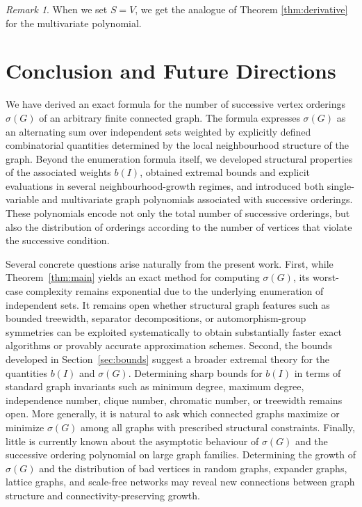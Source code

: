 \documentclass[11pt,a4paper]{article}
\numberwithin{equation}{section}
\theoremstyle{plain}
\theoremstyle{definition}
\theoremstyle{remark}
\newtheorem{remark}[theorem]{Remark}
\begin{document}
\begin{remark}
    When we set $S = V$, we get the analogue of Theorem \ref{thm:derivative} for the multivariate polynomial. 
\end{remark}

\section{Conclusion and Future Directions}
\label{sec:conclusion}

We have derived an exact formula for the number of successive vertex orderings \(\sigma(G)\) of an arbitrary finite connected graph. The formula expresses \(\sigma(G)\) as an alternating sum over independent sets weighted by explicitly defined combinatorial quantities determined by the local neighbourhood structure of the graph. Beyond the enumeration formula itself, we developed structural properties of the associated weights \(b(I)\), obtained extremal bounds and explicit evaluations in several neighbourhood-growth regimes, and introduced both single-variable and multivariate graph polynomials associated with successive orderings. These polynomials encode not only the total number of successive orderings, but also the distribution of orderings according to the number of vertices that violate the successive condition.

Several concrete questions arise naturally from the present work. First, while Theorem~\ref{thm:main} yields an exact method for computing \(\sigma(G)\), its worst-case complexity remains exponential due to the underlying enumeration of independent sets. It remains open whether structural graph features such as bounded treewidth, separator decompositions, or automorphism-group symmetries can be exploited systematically to obtain substantially faster exact algorithms or provably accurate approximation schemes.
Second, the bounds developed in Section~\ref{sec:bounds} suggest a broader extremal theory for the quantities \(b(I)\) and \(\sigma(G)\). Determining sharp bounds for \(b(I)\) in terms of standard graph invariants such as minimum degree, maximum degree, independence number, clique number, chromatic number, or treewidth remains open. More generally, it is natural to ask which connected graphs maximize or minimize \(\sigma(G)\) among all graphs with prescribed structural constraints.
Finally, little is currently known about the asymptotic behaviour of \(\sigma(G)\) and the successive ordering polynomial on large graph families. Determining the growth of \(\sigma(G)\) and the distribution of bad vertices in random graphs, expander graphs, lattice graphs, and scale-free networks may reveal new connections between graph structure and connectivity-preserving growth.
\end{document}

